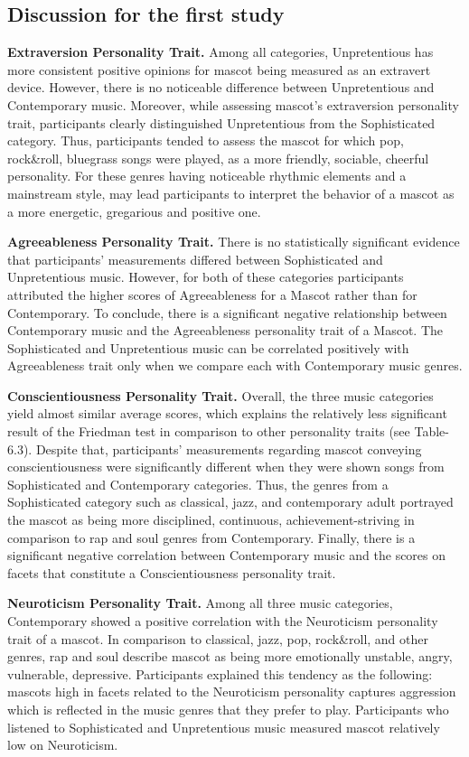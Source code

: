 \subsection{Discussion for the first study}
\par \textbf{Extraversion Personality Trait.} Among all categories, Unpretentious has more consistent positive opinions for mascot being measured as an extravert device. However, there is no noticeable difference between Unpretentious and Contemporary music. Moreover, while assessing mascot’s extraversion personality trait, participants clearly distinguished Unpretentious from the Sophisticated category. Thus, participants tended to assess the mascot for which pop, rock\&roll, bluegrass songs were played, as a more friendly, sociable, cheerful personality. For these genres having noticeable rhythmic elements and a mainstream style, may lead participants to interpret the behavior of a mascot as a more energetic, gregarious and positive one.
\par \textbf{Agreeableness Personality Trait.} There is no statistically significant evidence that participants’ measurements differed between Sophisticated and Unpretentious music. However, for both of these categories participants attributed the higher scores of Agreeableness for a Mascot rather than for Contemporary. To conclude, there is a significant negative relationship between Contemporary music and the Agreeableness personality trait of a Mascot. The Sophisticated and Unpretentious music can be correlated positively with Agreeableness trait only when we compare each with Contemporary music genres.
\par \textbf{Conscientiousness Personality Trait.} Overall, the three music categories yield almost similar average scores, which explains the relatively less significant result of the Friedman test in comparison to other personality traits (see Table-6.3). Despite that, participants’ measurements regarding mascot conveying conscientiousness were significantly different when they were shown songs from Sophisticated and Contemporary categories. Thus, the genres from a Sophisticated category such as classical, jazz, and contemporary adult portrayed the mascot as being more disciplined, continuous, achievement-striving in comparison to rap and soul genres from Contemporary. Finally, there is a significant negative correlation between Contemporary music and the scores on facets that constitute a Conscientiousness personality trait.
\par \textbf{Neuroticism Personality Trait.} Among all three music categories, Contemporary showed a positive correlation with the Neuroticism personality trait of a mascot. In comparison to classical, jazz, pop, rock\&roll, and other genres, rap and soul describe mascot as being more emotionally unstable, angry, vulnerable, depressive. Participants explained this tendency as the following: mascots high in facets related to the Neuroticism personality captures aggression which is reflected in the music genres that they prefer to play. Participants who listened to Sophisticated and Unpretentious music measured mascot relatively low on Neuroticism.
